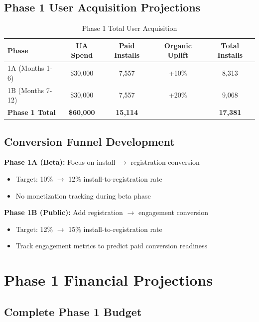 \documentclass[11pt,letterpaper]{article}
\begin{document}
\subsection{Phase 1 User Acquisition Projections}

\begin{table}[h]
\centering
\caption{Phase 1 Total User Acquisition}
\begin{tabular}{|l|c|c|c|c|}
\hline
\textbf{Phase} & \textbf{UA Spend} & \textbf{Paid Installs} & \textbf{Organic Uplift} & \textbf{Total Installs} \\
\hline
1A (Months 1-6) & \$30,000 & 7,557 & +10\% & 8,313 \\
1B (Months 7-12) & \$30,000 & 7,557 & +20\% & 9,068 \\
\textbf{Phase 1 Total} & \textbf{\$60,000} & \textbf{15,114} & & \textbf{17,381} \\
\hline
\end{tabular}
\end{table}

\subsection{Conversion Funnel Development}

\textbf{Phase 1A (Beta):} Focus on install $\rightarrow$ registration conversion
\begin{itemize}
\item Target: 10\% $\rightarrow$ 12\% install-to-registration rate
\item No monetization tracking during beta phase
\end{itemize}

\textbf{Phase 1B (Public):} Add registration $\rightarrow$ engagement conversion
\begin{itemize}
\item Target: 12\% $\rightarrow$ 15\% install-to-registration rate
\item Track engagement metrics to predict paid conversion readiness
\end{itemize}

\newpage

\section{Phase 1 Financial Projections}

\subsection{Complete Phase 1 Budget}
\end{document}
